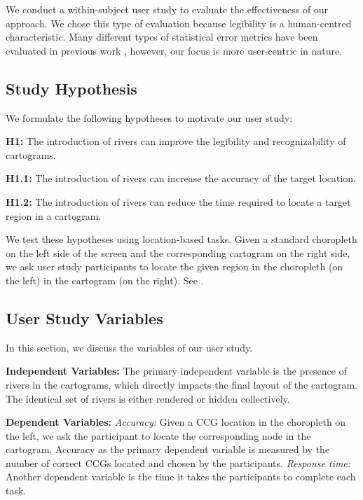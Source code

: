 \documentclass[Afour,sagev,times]{sagej}
\newcommand{\bobgraph}[1]{\noindent\textbf{#1}}
\begin{document}
We conduct a within-subject user study to evaluate the effectiveness of our approach.
We chose this type of evaluation because legibility is a human-centred characteristic.
Many different types of statistical error metrics have been evaluated in previous work \cite{nusrat2016State}, however, our focus is more user-centric in nature.

\subsection{Study Hypothesis}\label{subsec:{Study Hypothesis}}

We formulate the following hypotheses to motivate our user study:

\textbf{H1:} The introduction of rivers can improve the legibility and recognizability of cartograms.

\textbf{H1.1:} The introduction of rivers can increase the accuracy of the target location.

\textbf{H1.2:} The introduction of rivers can reduce the time required to locate a target region in a cartogram.

We test these hypotheses using location-based tasks.
Given a standard choropleth on the left side of the screen and the corresponding cartogram on the right side, we ask user study participants to locate the given region in the choropleth (on the left) in the cartogram (on the right).
See .

\subsection{User Study Variables}\label{subsec:{User Study Variables}}

In this section, we discuss the variables of our user study.

\bobgraph{Independent Variables: }The primary independent variable is the presence of rivers in the cartograms, which directly impacts the final layout of the cartogram. 
The identical set of rivers is either rendered or hidden collectively.

\bobgraph{Dependent Variables: }\textit{Accuracy:} Given a CCG location in the choropleth on the left, we ask the participant to locate the corresponding node in the cartogram.
Accuracy as the primary dependent variable is measured by the number of correct CCGs located and chosen by the participants.
\textit{Response time:} Another dependent variable is the time it takes the participants to complete each task.
\end{document}

